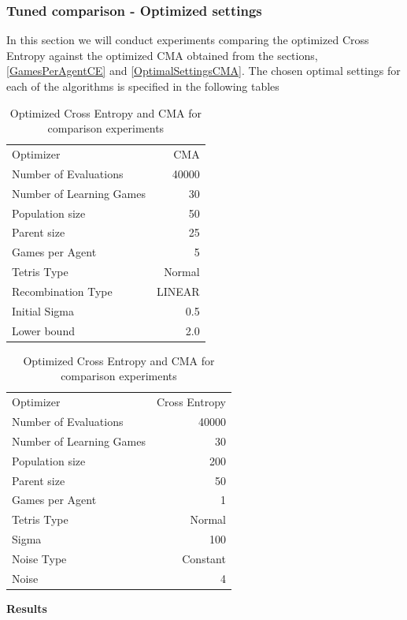 \subsubsection{Tuned comparison - Optimized settings \label{tunedComparison}}
In this section we will conduct experiments comparing the optimized Cross Entropy against the
optimized CMA obtained from the sections, \ref{GamesPerAgentCE} and \ref{OptimalSettingsCMA}.
The chosen optimal settings for each of the algorithms is specified in the following tables
\begin{table}[h]
\centering
\begin{tabular}{l r}
Optimizer & CMA\\
Number of Evaluations & 40000\\
Number of Learning Games & 30\\
Population size& 50\\
Parent size & 25\\
Games per Agent & 5\\
Tetris Type & Normal\\
\hline
Recombination Type & LINEAR\\
Initial Sigma & 0.5\\
Lower bound & 2.0\\
\end{tabular}
\quad
\begin{tabular}{l r}
Optimizer & Cross Entropy\\
Number of Evaluations & 40000\\
Number of Learning Games & 30\\
Population size & 200\\
Parent size & 50\\
Games per Agent & 1\\
Tetris Type & Normal\\
\hline
Sigma & 100\\
Noise Type & Constant\\
Noise & 4
\end{tabular}
\caption{Optimized Cross Entropy and CMA for comparison experiments}
\end{table}

\textbf{Results}\\

